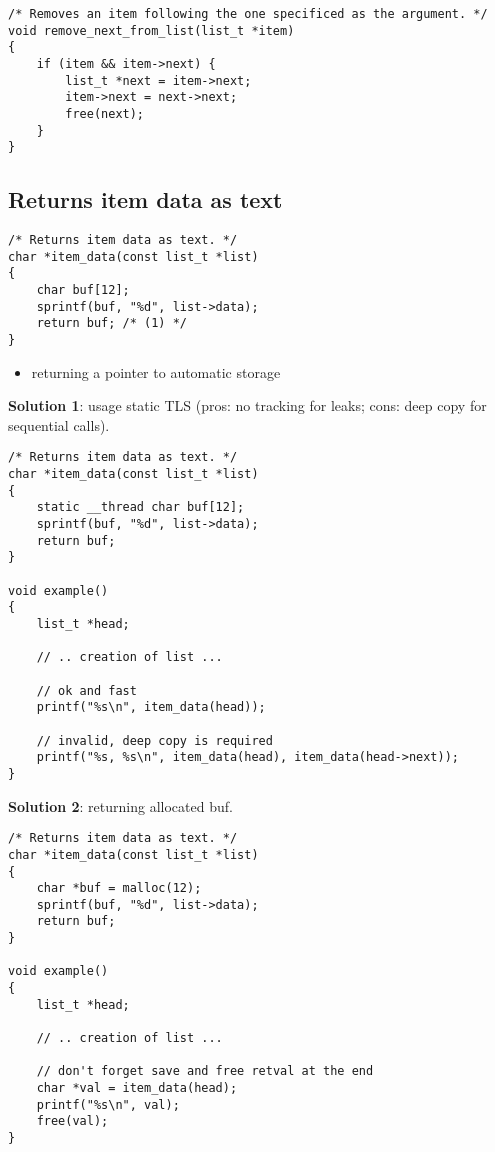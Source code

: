 \documentclass[a4paper,12pt]{article}
\begin{document}
\begin{lstlisting}
/* Removes an item following the one specificed as the argument. */
void remove_next_from_list(list_t *item)
{
	if (item && item->next) {
		list_t *next = item->next;
		item->next = next->next;
		free(next);
	}
}

\end{lstlisting}

\subsection{Returns item data as text}

\begin{lstlisting}
/* Returns item data as text. */
char *item_data(const list_t *list)
{
	char buf[12];
	sprintf(buf, "%d", list->data);
	return buf; /* (1) */
}
\end{lstlisting}

\begin{itemize}
	\item[\textcolor{black}\textbullet] returning a pointer to automatic storage
\end{itemize}

\textbf{Solution 1}: usage static TLS
(pros: no tracking for leaks; cons: deep copy for sequential calls).
\begin{lstlisting}
/* Returns item data as text. */
char *item_data(const list_t *list)
{
	static __thread char buf[12];
	sprintf(buf, "%d", list->data);
	return buf;
}

void example()
{
	list_t *head;

	// .. creation of list ...

	// ok and fast
	printf("%s\n", item_data(head));

	// invalid, deep copy is required
	printf("%s, %s\n", item_data(head), item_data(head->next));
}

\end{lstlisting}

\textbf{Solution 2}: returning allocated buf.
\begin{lstlisting}
/* Returns item data as text. */
char *item_data(const list_t *list)
{
	char *buf = malloc(12);
	sprintf(buf, "%d", list->data);
	return buf;
}

void example()
{
	list_t *head;

	// .. creation of list ...

	// don't forget save and free retval at the end 
	char *val = item_data(head);
	printf("%s\n", val);
	free(val);
}

\end{lstlisting}
\end{document}
